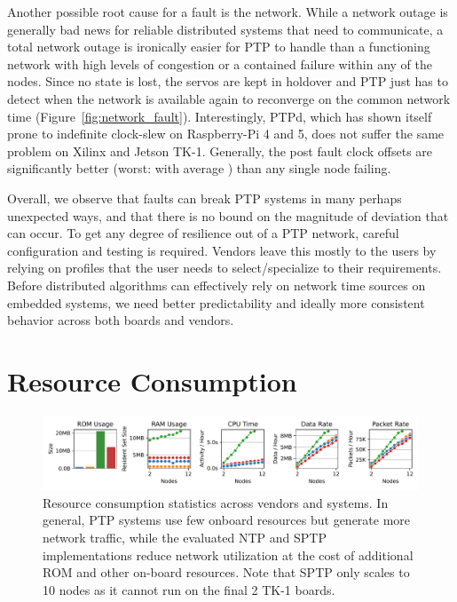 Another possible root cause for a fault is the network. While a network outage is generally bad news for reliable distributed systems that need to communicate, a total network outage is ironically easier for PTP to handle than a functioning network with high levels of congestion or a contained failure within any of the nodes. Since no state is lost, the servos are kept in holdover and PTP just has to detect when the network is available again to reconverge on the common network time (Figure~\ref{fig:network_fault}). Interestingly, PTPd, which has shown itself prone to indefinite clock-slew on Raspberry-Pi 4 and 5, does not suffer the same problem on Xilinx and Jetson TK-1. Generally, the post fault clock offsets are significantly better (worst: \fVendorCluster{\cmpMaxArg} with average \fTime[-1]{\cmpMax}) than any single node failing.

Overall, we observe that faults can break PTP systems in many perhaps unexpected ways, and that there is no bound on the magnitude of deviation that can occur. To get any degree of resilience out of a PTP network, careful configuration and testing is required. Vendors leave this mostly to the users by relying on profiles that the user needs to select/specialize to their requirements. Before distributed algorithms can effectively rely on network time sources on embedded systems, we need better predictability and ideally more consistent behavior across both boards and vendors.

\section{Resource Consumption}
\label{sec:resource_consumption}

\begin{figure}
\centering
\includegraphics[width=\linewidth]{res/generated/resource_consumption/summary_trend.pdf}
\legend
\caption{Resource consumption statistics across vendors and systems. In general, PTP systems use few onboard resources but generate more network traffic, while the evaluated NTP and SPTP implementations reduce network utilization at the cost of additional ROM and other on-board resources. Note that SPTP only scales to 10 nodes as it cannot run on the final 2 TK-1 boards.}
\label{fig:resource_consumption}
\end{figure}

